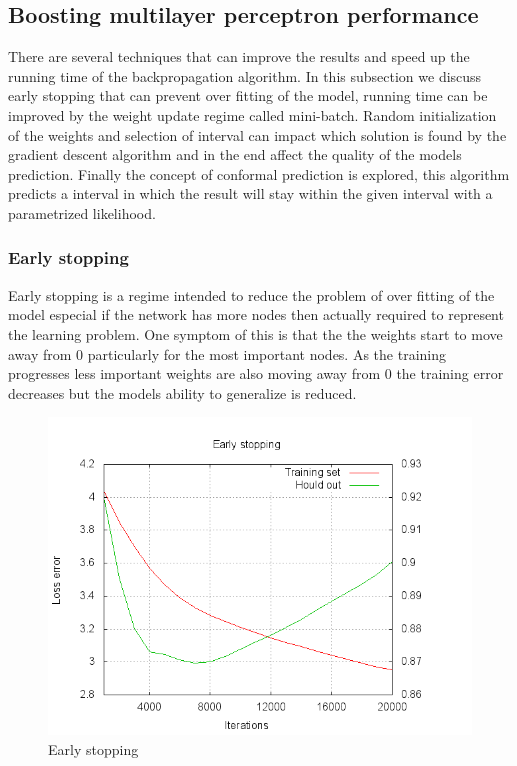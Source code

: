 \subsection{Boosting multilayer perceptron performance} \label{sss:boosting_mlp}
There are several techniques that can improve the results and speed up the running time of the backpropagation algorithm. In this subsection we discuss early stopping that can prevent over fitting of the model, running time can be improved by the weight update regime called mini-batch. Random initialization of the weights and selection of interval can impact which solution is found by the gradient descent algorithm and in the end affect the quality of the models prediction. Finally the concept of conformal prediction is explored, this algorithm predicts a interval in which the result will stay within the given interval with a parametrized likelihood.   


\subsubsection{Early stopping} \label{sss:boosting_mlp_stopping}
Early stopping is a regime intended to reduce the problem of over fitting of the model especial if the network has more nodes then actually required to represent the learning problem. One symptom of this is that the the weights start to move away from 0 particularly for the most important nodes. As the training progresses less important weights are also moving away from 0 the training error decreases but the models ability to generalize is reduced. 

\begin{figure}
\vspace{-20pt}
\begin{center}
\includegraphics[scale=0.42]{eval24f.png}
\end{center}
\vspace{-20pt}
\caption{Early stopping}
\label{graph:early_stop}
\end{figure} %

